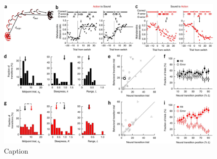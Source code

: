 \begin{figure}[htbp]

\begin{center}
\includegraphics[width=\textwidth]{Figures/NN_fig4.jpg} 
\end{center}

\caption[Transitions in ensemble activity occur earlier and more abruptly following switch to sound rule]
{Caption}

\label{fig:NN_fig4}
\end{figure}